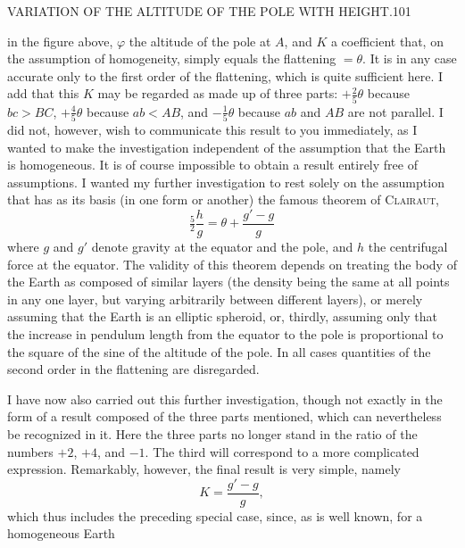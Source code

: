 \clearpage
\noindent\mbox{}\hfill VARIATION OF THE ALTITUDE OF THE POLE WITH HEIGHT.\hfill 101\par
\noindent in the figure above, $\varphi$ the altitude of the pole at $A$, and $K$ a coefficient that, on the assumption of homogeneity, simply equals the flattening $=\theta$. It is in any case accurate only to the first order of the flattening, which is quite sufficient here. I add that this $K$ may be regarded as made up of three parts: $+\tfrac25\theta$ because $bc>BC$, $+\tfrac45\theta$ because $ab<AB$, and $-\tfrac15\theta$ because $ab$ and $AB$ are not parallel. I did not, however, wish to communicate this result to you immediately, as I wanted to make the investigation independent of the assumption that the Earth is homogeneous. It is of course impossible to obtain a result entirely free of assumptions. I wanted my further investigation to rest solely on the assumption that has as its basis (in one form or another) the famous theorem of \textsc{Clairaut},
\[
\tfrac52\frac hg=\theta+\frac{g'-g}g
\]
where $g$ and $g'$ denote gravity at the equator and the pole, and $h$ the centrifugal force at the equator. The validity of this theorem depends on treating the body of the Earth as composed of similar layers (the density being the same at all points in any one layer, but varying arbitrarily between different layers), or merely assuming that the Earth is an elliptic spheroid, or, thirdly, assuming only that the increase in pendulum length from the equator to the pole is proportional to the square of the sine of the altitude of the pole. In all cases quantities of the second order in the flattening are disregarded.

I have now also carried out this further investigation, though not exactly in the form of a result composed of the three parts mentioned, which can nevertheless be recognized in it. Here the three parts no longer stand in the ratio of the numbers $+2$, $+4$, and $-1$. The third will correspond to a more complicated expression. Remarkably, however, the final result is very simple, namely
\[
K=\frac{g'-g}g,
\]
which thus includes the preceding special case, since, as is well known, for a homogeneous Earth
